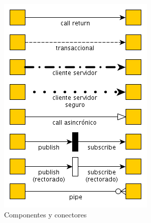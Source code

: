 \begin{figure}[H]
	\begin{center}
		\includegraphics[scale=1]{../informe/imagenes/tipos_conectores.png}
	\end{center} 
	\caption{Componentes y conectores}	
	\label{fig:vistaPrincipal}
\end{figure}

